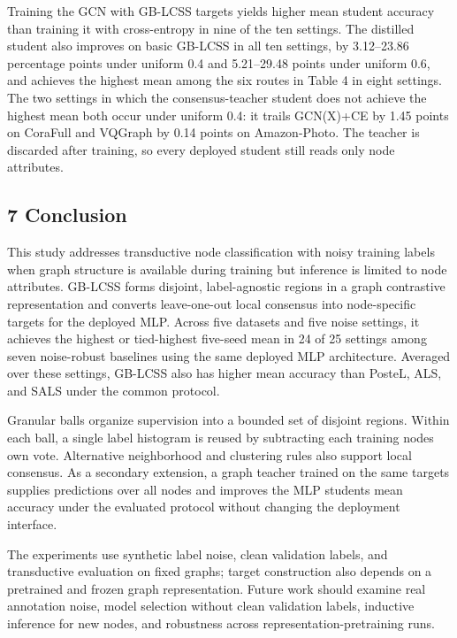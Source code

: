 Training the GCN with GB-LCSS targets yields higher mean student accuracy than training it with cross-entropy in nine of the ten settings. The distilled student also improves on basic GB-LCSS in all ten settings, by 3.12--23.86 percentage points under uniform 0.4 and 5.21--29.48 points under uniform 0.6, and achieves the highest mean among the six routes in Table 4 in eight settings. The two settings in which the consensus-teacher student does not achieve the highest mean both occur under uniform 0.4: it trails GCN(X)+CE by 1.45 points on CoraFull and VQGraph by 0.14 points on Amazon-Photo. The teacher is discarded after training, so every deployed student still reads only node attributes.

\subsection{7 Conclusion}\label{conclusion}

This study addresses transductive node classification with noisy training labels when graph structure is available during training but inference is limited to node attributes. GB-LCSS forms disjoint, label-agnostic regions in a graph contrastive representation and converts leave-one-out local consensus into node-specific targets for the deployed MLP. Across five datasets and five noise settings, it achieves the highest or tied-highest five-seed mean in 24 of 25 settings among seven noise-robust baselines using the same deployed MLP architecture. Averaged over these settings, GB-LCSS also has higher mean accuracy than PosteL, ALS, and SALS under the common protocol.

Granular balls organize supervision into a bounded set of disjoint regions. Within each ball, a single label histogram is reused by subtracting each training node\textquotesingle s own vote. Alternative neighborhood and clustering rules also support local consensus. As a secondary extension, a graph teacher trained on the same targets supplies predictions over all nodes and improves the MLP student\textquotesingle s mean accuracy under the evaluated protocol without changing the deployment interface.

The experiments use synthetic label noise, clean validation labels, and transductive evaluation on fixed graphs; target construction also depends on a pretrained and frozen graph representation. Future work should examine real annotation noise, model selection without clean validation labels, inductive inference for new nodes, and robustness across representation-pretraining runs.

